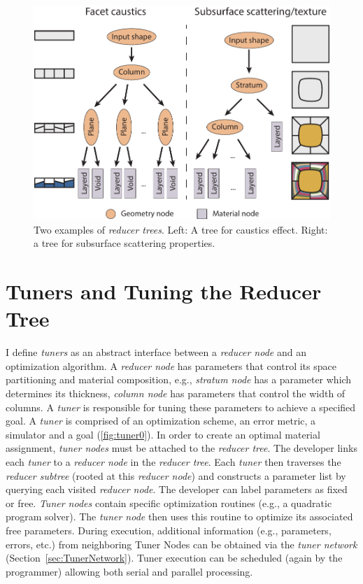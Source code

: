 \begin{figure}[h]
\centering
\includegraphics[width=0.7\linewidth]{figure/redNetworkNew.pdf}
\caption{Two examples of \emph{reducer trees}. Left: A tree for caustics effect.
Right: a tree for subsurface scattering properties.
}
\label{fig:red1}
\end{figure}

\section{Tuners and Tuning the Reducer Tree}
I define \emph{tuners} as an abstract interface between a \emph{reducer node} and an optimization algorithm. 
A \emph{reducer node} has parameters that control its space partitioning and material composition, e.g., \emph{stratum node} has a parameter which determines its thickness, \emph{column node} has parameters that control the width of columns.
A \emph{tuner} is responsible for tuning these parameters to achieve a specified goal.
A \emph{tuner} is comprised of an optimization scheme, an error metric, a simulator and a goal (\autoref{fig:tuner0}). 
In order to create an optimal material assignment, \emph{tuner nodes} must be attached to the \emph{reducer tree}. The developer links each \emph{tuner} to a \emph{reducer node} in the \emph{reducer tree}. Each \emph{tuner} then traverses the \emph{reducer subtree} (rooted at this \emph{reducer node}) and constructs a parameter list by querying each visited \emph{reducer node}. The developer can label parameters as fixed or free. \emph{Tuner nodes} contain specific optimization routines (e.g., a quadratic program solver). The \emph{tuner node} then uses this routine to optimize its associated free parameters. During execution, additional information (e.g., parameters, errors, etc.) from neighboring Tuner Nodes can be obtained via the \emph{tuner network} (Section~\ref{sec:TunerNetwork}).  Tuner execution can be scheduled (again by the programmer) allowing both serial and parallel processing. 

